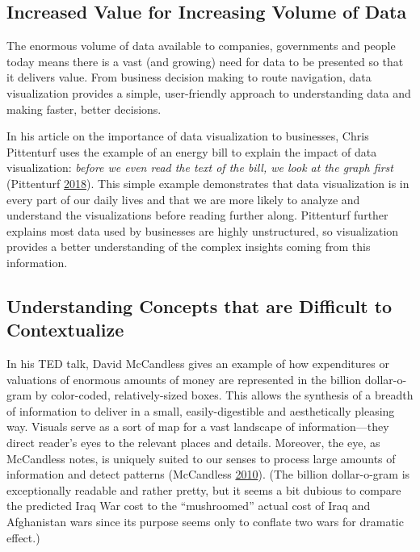 \documentclass[]{book}
\begin{document}
\hypertarget{increased-value-for-increasing-volume-of-data}{%
\subsection{Increased Value for Increasing Volume of Data}\label{increased-value-for-increasing-volume-of-data}}

The enormous volume of data available to companies, governments and people today means there is a vast (and growing) need for data to be presented so that it delivers value. From business decision making to route navigation, data visualization provides a simple, user-friendly approach to understanding data and making faster, better decisions.

In his article on the importance of data visualization to businesses, Chris Pittenturf uses the example of an energy bill to explain the impact of data visualization: \emph{before we even read the text of the bill, we look at the graph first} (Pittenturf \protect\hyperlink{ref-viz_importance}{2018}). This simple example demonstrates that data visualization is in every part of our daily lives and that we are more likely to analyze and understand the visualizations before reading further along. Pittenturf further explains most data used by businesses are highly unstructured, so visualization provides a better understanding of the complex insights coming from this information.

\hypertarget{understanding-concepts-that-are-difficult-to-contextualize}{%
\subsection{Understanding Concepts that are Difficult to Contextualize}\label{understanding-concepts-that-are-difficult-to-contextualize}}

In his TED talk, David McCandless gives an example of how expenditures or valuations of enormous amounts of money are represented in the billion dollar-o-gram by color-coded, relatively-sized boxes. This allows the synthesis of a breadth of information to deliver in a small, easily-digestible and aesthetically pleasing way. Visuals serve as a sort of map for a vast landscape of information---they direct reader's eyes to the relevant places and details. Moreover, the eye, as McCandless notes, is uniquely suited to our senses to process large amounts of information and detect patterns (McCandless \protect\hyperlink{ref-viz_ted}{2010}). (The billion dollar-o-gram is exceptionally readable and rather pretty, but it seems a bit dubious to compare the predicted Iraq War cost to the ``mushroomed'' actual cost of Iraq and Afghanistan wars since its purpose seems only to conflate two wars for dramatic effect.)
\end{document}
